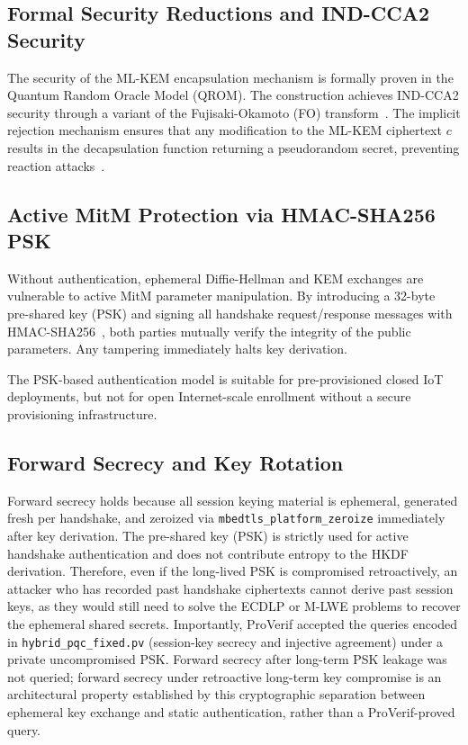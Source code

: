 \documentclass[journal, 10pt]{IEEEtran}
\begin{document}
\subsection{Formal Security Reductions and IND-CCA2 Security}
The security of the ML-KEM encapsulation mechanism is formally proven in the Quantum Random Oracle Model (QROM). The construction achieves IND-CCA2 security through a variant of the Fujisaki-Okamoto (FO) transform~\cite{b4,b23}. The implicit rejection mechanism ensures that any modification to the ML-KEM ciphertext $c$ results in the decapsulation function returning a pseudorandom secret, preventing reaction attacks~\cite{b4}.

\subsection{Active MitM Protection via HMAC-SHA256 PSK}
Without authentication, ephemeral Diffie-Hellman and KEM exchanges are vulnerable to active MitM parameter manipulation. By introducing a 32-byte pre-shared key (PSK) and signing all handshake request/response messages with HMAC-SHA256~\cite{b24,b37}, both parties mutually verify the integrity of the public parameters. Any tampering immediately halts key derivation.

The PSK-based authentication model is suitable for pre-provisioned closed IoT deployments, but not for open Internet-scale enrollment without a secure provisioning infrastructure.

\subsection{Forward Secrecy and Key Rotation}
Forward secrecy holds because all session keying material is ephemeral, generated fresh per handshake, and zeroized via \texttt{mbedtls\_platform\_zeroize} immediately after key derivation. The pre-shared key (PSK) is strictly used for active handshake authentication and does not contribute entropy to the HKDF derivation. Therefore, even if the long-lived PSK is compromised retroactively, an attacker who has recorded past handshake ciphertexts cannot derive past session keys, as they would still need to solve the ECDLP or M-LWE problems to recover the ephemeral shared secrets. Importantly, ProVerif accepted the queries encoded in \texttt{hybrid\_pqc\_fixed.pv} (session-key secrecy and injective agreement) under a private uncompromised PSK. Forward secrecy after long-term PSK leakage was not queried; forward secrecy under retroactive long-term key compromise is an architectural property established by this cryptographic separation between ephemeral key exchange and static authentication, rather than a ProVerif-proved query.
\end{document}
